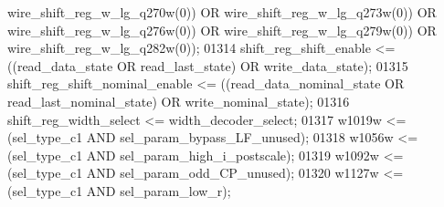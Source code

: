 \begin{DoxyCode}
{{      wire_shift_reg_w_lg_q270w}\textcolor{vhdlchar}{(}\textcolor{vhdllogic}{}\textcolor{vhdllogic}{0}\textcolor{vhdlchar}{)}\textcolor{vhdlchar}{)} \textcolor{keywordflow}{OR} \textcolor{vhdlchar}{wire_shift_reg_w_lg_q273w}\textcolor{vhdlchar}{(}\textcolor{vhdllogic}{}\textcolor{vhdllogic}{0}\textcolor{vhdlchar}{)}\textcolor{vhdlchar}{)} \textcolor{keywordflow}{OR} \textcolor{vhdlchar}{
      wire_shift_reg_w_lg_q276w}\textcolor{vhdlchar}{(}\textcolor{vhdllogic}{}\textcolor{vhdllogic}{0}\textcolor{vhdlchar}{)}\textcolor{vhdlchar}{)} \textcolor{keywordflow}{OR} \textcolor{vhdlchar}{wire_shift_reg_w_lg_q279w}\textcolor{vhdlchar}{(}\textcolor{vhdllogic}{}\textcolor{vhdllogic}{0}\textcolor{vhdlchar}{)}\textcolor{vhdlchar}{)} \textcolor{keywordflow}{OR} \textcolor{vhdlchar}{
      wire_shift_reg_w_lg_q282w}\textcolor{vhdlchar}{(}\textcolor{vhdllogic}{}\textcolor{vhdllogic}{0}\textcolor{vhdlchar}{)}\textcolor{vhdlchar}{)};
01314     \textcolor{vhdlchar}{shift_reg_shift_enable} \textcolor{vhdlchar}{<=} \textcolor{vhdlchar}{(}\textcolor{vhdlchar}{(}\textcolor{vhdlchar}{read_data_state} \textcolor{keywordflow}{OR} \textcolor{vhdlchar}{read_last_state}\textcolor{vhdlchar}{)} \textcolor{keywordflow}{OR} \textcolor{vhdlchar}{
      write_data_state}\textcolor{vhdlchar}{)};
01315     \textcolor{vhdlchar}{shift_reg_shift_nominal_enable} \textcolor{vhdlchar}{<=} \textcolor{vhdlchar}{(}\textcolor{vhdlchar}{(}\textcolor{vhdlchar}{read_data_nominal_state} \textcolor{keywordflow}{OR} \textcolor{vhdlchar}{
      read_last_nominal_state}\textcolor{vhdlchar}{)} \textcolor{keywordflow}{OR} \textcolor{vhdlchar}{write_nominal_state}\textcolor{vhdlchar}{)};
01316     \textcolor{vhdlchar}{shift_reg_width_select} \textcolor{vhdlchar}{<=} \textcolor{vhdlchar}{width_decoder_select};
01317     \textcolor{vhdlchar}{w1019w} \textcolor{vhdlchar}{<=} \textcolor{vhdlchar}{(}\textcolor{vhdlchar}{sel_type_c1} \textcolor{keywordflow}{AND} \textcolor{vhdlchar}{sel_param_bypass_LF_unused}\textcolor{vhdlchar}{)};
01318     \textcolor{vhdlchar}{w1056w} \textcolor{vhdlchar}{<=} \textcolor{vhdlchar}{(}\textcolor{vhdlchar}{sel_type_c1} \textcolor{keywordflow}{AND} \textcolor{vhdlchar}{sel_param_high_i_postscale}\textcolor{vhdlchar}{)};
01319     \textcolor{vhdlchar}{w1092w} \textcolor{vhdlchar}{<=} \textcolor{vhdlchar}{(}\textcolor{vhdlchar}{sel_type_c1} \textcolor{keywordflow}{AND} \textcolor{vhdlchar}{sel_param_odd_CP_unused}\textcolor{vhdlchar}{)};
01320     \textcolor{vhdlchar}{w1127w} \textcolor{vhdlchar}{<=} \textcolor{vhdlchar}{(}\textcolor{vhdlchar}{sel_type_c1} \textcolor{keywordflow}{AND} \textcolor{vhdlchar}{sel_param_low_r}\textcolor{vhdlchar}{)};
}
\end{DoxyCode}
